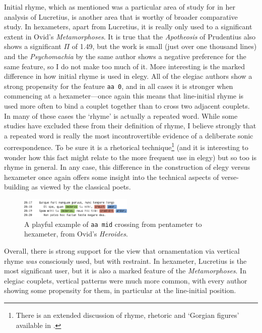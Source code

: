 \documentclass[twocolumn, switch, a4paper]{article} %
\begin{document}
Initial rhyme, which as mentioned was a particular area of study for
\citeauthor{deutsch_1978} in her analysis of Lucretius, is another area that
is worthy of broader comparative study. In hexameters, apart from Lucretius,
it is really only used to a significant extent in Ovid's \emph{Metamorphoses}.
It is true that the \emph{Apotheosis} of Prudentius also shows a significant
$\Pi$ of 1.49, but the work is small (just over one thousand lines) and the
\emph{Psychomachia} by the same author shows a negative preference for the
same feature, so I do not make too much of it. More interesting is the marked
difference in how initial rhyme is used in elegy. All of the elegiac authors
show a strong propensity for the feature \texttt{aa 0}, and in all cases it is
stronger when commencing at a hexameter---once again this means that
line-initial rhyme is used more often to bind a couplet together than to cross
two adjacent couplets. In many of these cases the `rhyme' is actually a
repeated word. While some studies have excluded these from their definition of
rhyme, I believe strongly that a repeated word is really the most
incontrovertible evidence of a deliberate sonic correspondence. To be sure it
is a rhetorical technique\footnote{
  There is an extended discussion of rhyme, rhetoric and `Gorgian figures'
  available in .
}
(and it is interesting to wonder how this fact might relate to the more
frequent use in elegy) but so too is rhyme in general. In any case, this
difference in the construction of elegy versus hexameter once again offers
some insight into the technical aspects of verse-building as viewed by the
classical poets.

\begin{figure}
    \caption{
      A playful example of \texttt{aa mid} crossing from pentameter to
      hexameter, from Ovid's \emph{Heroides}.
    }
    \label{fig:heroides_pent}
    \centering
    \includegraphics[width=0.48\textwidth]{heroides_pent.pdf}
\end{figure}

Overall, there is strong support for the view that ornamentation via vertical
rhyme \emph{was} consciously used, but with restraint. In hexameter, Lucretius
is the most significant user, but it is also a marked feature of the
\emph{Metamorphoses}. In elegiac couplets, vertical patterns were much more
common, with every author showing some propensity for them, in particular at
the line-initial position. 
\end{document}
